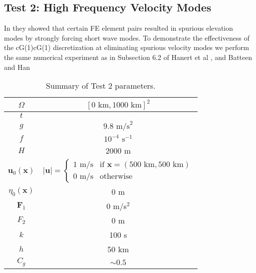 \subsection{Test 2: High Frequency Velocity Modes}
  In \cite{Hanert2002} they showed that certain FE element pairs resulted in
  spurious elevation modes by strongly forcing short wave modes.  To demonstrate
  the effectiveness of the cG(1)cG(1) discretization at eliminating spurious
  velocity modes we perform the same numerical experiment as in Subsection 6.2
  of Hanert et al \cite{Hanert2002}, and Batteen and Han \cite{Batteen1981}

  \def\arraystretch{1.25} %
  \begin{table}[H]
    \begin{center}
      \begin{tabular}{|c|c|}
        \hline
        $\Omega$ & $[0\text{ km}, 1000\text{ km}]^2$ \\ \hline
        $t$ &  \\ \hline
        $g$ & $9.8\text{ m/s}^2$ \\ \hline 
        $f$ & $10^{-4}\text{ s}^{-1}$ \\ \hline
        $H$ & 2000 m \\ \hline
        $\mathbf{u}_0(\mathbf{x})$ & 
          $\left|\mathbf{u}\right| = 
            \begin{cases}
              1\text{ m/s} & \text{if }\mathbf{x}=(500\text{ km}, 500\text{ km}) \\ 
              0\text{ m/s} & \text{otherwise}
            \end{cases}$ \\ \hline
          $\eta_0(\mathbf{x})$ & 0 m \\ \hline
        $\mathbf{F}_1$ & 0 m/s$^2$\\ \hline
        $F_2$ & 0 m\\ \hline
        $k$ & 100 s \\ \hline
        $h$ & 50 km \\ \hline
        $C_g$ & $\sim 0.5$ \\ \hline
      \end{tabular}
      \caption{Summary of Test 2 parameters.}
      \label{tab:HFVelocityParams}
    \end{center}
  \end{table}

